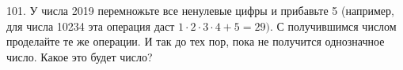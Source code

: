 101. У числа 2019 перемножьте все ненулевые цифры и прибавьте 5 (например, для числа 10234 эта операция даст $1\cdot2\cdot3\cdot4+5=29).$ С получившимся числом проделайте те же операции. И так до тех пор, пока не получится однозначное число. Какое это будет число?\\
